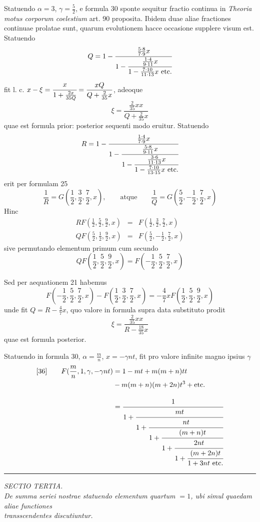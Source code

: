Statuendo $\alpha=3$, $\gamma=\frac52$, e formula 30 sponte sequitur fractio continua in \textit{Theoria motus corporum coelestium} art. 90 proposita. Ibidem duae aliae fractiones continuae prolatae sunt, quarum evolutionem hacce occasione supplere visum est. Statuendo
\[
Q=1-\cfrac{\frac{5\cdot8}{7\cdot9}x}{1-\cfrac{\frac{1\cdot4}{9\cdot11}x}{1-\frac{7\cdot10}{11\cdot13}x\ \mathrm{etc.}}}
\]
fit l. c. $\displaystyle x-\xi=\cfrac{x}{1+\frac{2x}{35Q}}=\frac{xQ}{Q+\frac2{35}x}$, adeoque
\[
\xi=\frac{\frac2{35}xx}{Q+\frac2{35}x}
\]
quae est formula prior: posterior sequenti modo eruitur. Statuendo
\[
R=1-\cfrac{\frac{1\cdot4}{7\cdot9}x}{1-\cfrac{\frac{5\cdot8}{9\cdot11}x}{1-\cfrac{\frac{3\cdot6}{11\cdot13}x}{1-\frac{7\cdot10}{13\cdot15}x\ \mathrm{etc.}}}}
\]
erit per formulam 25
\[
\frac1R=G(\frac12,\frac32,\frac72,x),
\qquad\mbox{atque}\qquad
\frac1Q=G(\frac52,-\frac12,\frac72,x)
\]
Hinc
\[
\begin{array}{rcl}
RF(\frac12,\frac52,\frac92,x)&=&F(\frac12,\frac32,\frac72,x)\\[4pt]
QF(\frac52,\frac12,\frac92,x)&=&F(\frac52,-\frac12,\frac72,x)
\end{array}
\]
sive permutando elementum primum cum secundo
\[
QF(\frac12,\frac52,\frac92,x)=F(-\frac12,\frac52,\frac72,x)
\]
\par
Sed per aequationem 21 habemus
\[
F(-\frac12,\frac52,\frac72,x)-F(\frac12,\frac32,\frac72,x)
=-\frac47xF(\frac12,\frac52,\frac92,x)
\]
unde fit $Q=R-\frac47x$, quo valore in formula supra data substituto prodit
\[
\xi=\frac{\frac2{35}xx}{R-\frac{18}{35}x}
\]
quae est formula posterior.
\par
Statuendo in formula 30, $\alpha=\frac mn$, $x=-\gamma nt$, fit pro valore infinite magno ipsius $\gamma$
\[
\begin{aligned}
{}[36]\qquad F(\frac mn,1,\gamma,-\gamma nt)
&=1-mt+m(m+n)tt\\&{}-m(m+n)(m+2n)t^3+\mathrm{etc.}\\[8pt]
&=\displaystyle\cfrac{1}{1+\cfrac{mt}{1+\cfrac{nt}{1+\cfrac{(m+n)t}{1+\cfrac{2nt}{1+\cfrac{(m+2n)t}{1+3nt\ \mathrm{etc.}}}}}}}
\end{aligned}
\]
\begin{center}\rule{0.27\textwidth}{0.4pt}\end{center}
\par{}\begin{center}
\textit{SECTIO TERTIA.}\\[6pt]
\textit{De summa seriei nostrae statuendo elementum quartum $=1$, ubi simul quaedam aliae functiones}\\
\textit{transscendentes discutiuntur.}\\[6pt]
\end{center}

